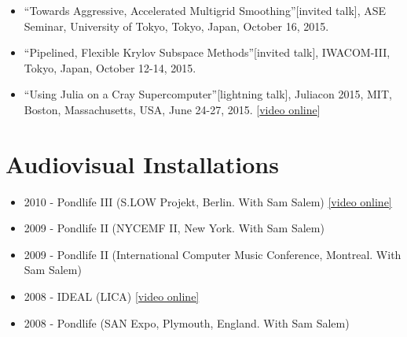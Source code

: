 \begin{itemize}
  \item ``Towards Aggressive, Accelerated Multigrid Smoothing''[invited talk], ASE Seminar, University of Tokyo, Tokyo, Japan, October 16, 2015.
  \item ``Pipelined, Flexible Krylov Subspace Methods''[invited talk], IWACOM-III, Tokyo, Japan, October 12-14, 2015.
  \item ``Using Julia on a Cray Supercomputer''[lightning talk], Juliacon 2015, MIT, Boston, Massachusetts, USA, June 24-27, 2015. [\href{https://www.youtube.com/watch?v=NwyKz2KLdtY}{video online}]
\end{itemize}

%
\section*{Audiovisual Installations}
\begin{itemize}
\item 2010 - Pondlife III (S.LOW Projekt, Berlin. With Sam Salem) {\href{http://vimeo.com/14878086}{[video online]}}
\item 2009 - Pondlife II (NYCEMF II, New York. With Sam Salem)
\item 2009 - Pondlife II (International Computer Music Conference, Montreal. With Sam Salem)
\item 2008 - IDEAL (LICA) {\href{http://vimeo.com/5741743}{[video online]}}
\item 2008 - Pondlife (SAN Expo, Plymouth, England. With Sam Salem)
\end{itemize}

